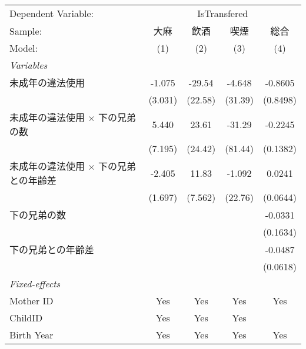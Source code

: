 \documentclass{article}
\begin{document}
\begin{landscape}


\begingroup
\centering
\begin{threeparttable}[b]
   \begin{tabular}{lcccc}
      \tabularnewline \midrule \midrule
      Dependent Variable: & \multicolumn{4}{c}{IsTransfered}\\
      Sample:                                       & 大麻    & 飲酒    & 喫煙    & 総合 \\   
      Model:                                        & (1)     & (2)     & (3)     & (4)\\  
      \midrule
      \emph{Variables}\\
      未成年の違法使用                              & -1.075  & -29.54  & -4.648  & -0.8605\\   
                                                    & (3.031) & (22.58) & (31.39) & (0.8498)\\   
      未成年の違法使用 $\times$ 下の兄弟の数        & 5.440   & 23.61   & -31.29  & -0.2245\\   
                                                    & (7.195) & (24.42) & (81.44) & (0.1382)\\   
      未成年の違法使用 $\times$ 下の兄弟との年齢差  & -2.405  & 11.83   & -1.092  & 0.0241\\   
                                                    & (1.697) & (7.562) & (22.76) & (0.0644)\\   
      下の兄弟の数                                  &         &         &         & -0.0331\\   
                                                    &         &         &         & (0.1634)\\   
      下の兄弟との年齢差                            &         &         &         & -0.0487\\   
                                                    &         &         &         & (0.0618)\\   
      \midrule
      \emph{Fixed-effects}\\
      Mother ID                                     & Yes     & Yes     & Yes     & Yes\\  
      ChildID                                       & Yes     & Yes     & Yes     & \\  
      Birth Year                                    & Yes     & Yes     & Yes     & Yes\\  
      \midrule

\end{tabular}
\end{threeparttable}
\end{landscape}
\end{document}
